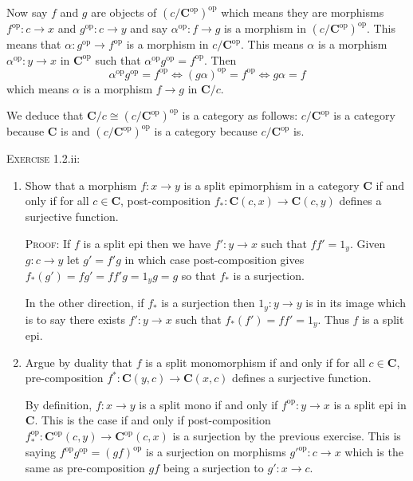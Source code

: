 \documentclass{article}
\newcommand{\op}{\textrm{op}}
\begin{document}
Now say \(f\) and \(g\) are objects of \((c/\mathbf{C}^\op)^\op\) which means they are morphisms \(f^\op:c→x\) and \(g^\op:c→y\) and say \(α^\op:f→g\) is a morphism in \((c/\mathbf{C}^\op)^\op\). This means that \(α:g^\op→f^\op\) is a morphism in \(c/\mathbf{C}^\op\). This means \(α\) is a morphism \(α^\op:y→x\) in \(\mathbf{C}^\op\) such that \(α^\op g^\op=f^\op\). Then
\begin{equation*}
α^\op g^\op=f^\op ⇔ (gα)^\op = f^\op ⇔ gα=f
\end{equation*}
which means \(α\) is a morphism \(f→g\) in \(\mathbf{C}/c\).

We deduce that \(\mathbf{C}/c≅(c/\mathbf{C}^\op)^\op\) is a category as follows: \(c/\mathbf{C}^\op\) is a category because \(\mathbf{C}\) is and \((c/\mathbf{C}^\op)^\op\) is a category because \(c/\mathbf{C}^\op\) is.
\vspace{8pt}

\noindent
\textsc{Exercise} 1.2.ii:
\begin{enumerate}
\item Show that a morphism \(f:x→y\) is a split epimorphism in a category \textbf{C} if and only if for all \(c∈\mathbf{C}\), post-composition \(f_*:\mathbf{C}(c,x)→ \mathbf{C}(c,y)\) defines a surjective function.

\noindent
\textsc{Proof:} If \(f\) is a split epi then we have \(f':y→x\) such that \(ff'=1_y\). Given \(g:c→y\) let \(g'=f'g\) in which case post-composition gives \(f_*(g') = fg'=ff'g=1_yg=g\) so that \(f_*\) is a surjection.

In the other direction, if \(f_*\) is a surjection then \(1_y:y→y\) is in its image which is to say there exists \(f':y→x\) such that \(f_*(f') = ff'=1_y\). Thus \(f\) is a split epi.

\item Argue by duality that \(f\) is a split monomorphism if and only if for all \(c∈\mathbf{C}\), pre-composition \(f^*:\mathbf{C}(y,c)→ \mathbf{C}(x,c)\) defines a surjective function.
\vspace{5pt}

\noindent
By definition, \(f:x→y\) is a split mono if and only if \(f^\op:y→x\) is a split epi in \textbf{C}. This is the case if and only if post-composition \(f^\op_*:\mathbf{C}^\op(c, y)→\mathbf{C}^\op(c, x)\) is a surjection by the previous exercise. This is saying \(f^\op g^\op = (gf)^\op\) is a surjection on morphisms \(g'^\op:c→x\) which is the same as pre-composition \(gf\) being a surjection to \(g':x→c\).
\end{enumerate}
\end{document}
